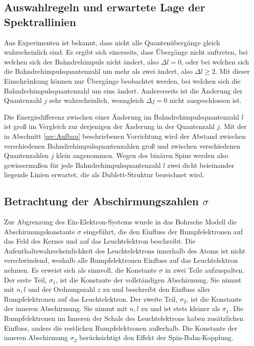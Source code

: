 \subsection{Auswahlregeln und erwartete Lage der Spektrallinien}
Aus Experimenten ist bekannt, dass nicht alle Quantenübergänge gleich wahrscheinlich sind.
Es ergibt sich einerseits, dass Übergänge nicht auftreten, bei welchen sich der Bahndrehimpuls nicht ändert, also $\Delta l=0$, oder bei welchen sich die Bahndrehimpulsquantenzahl um mehr als zwei ändert, also $\Delta l\ge2$.
Mit dieser Einschränkung können nur Übergänge beobachtet werden, bei welchen sich die Bahndrehimpulsquantenzahl um eins ändert.
Andererseits ist die Änderung der Quantenzahl $j$ sehr wahrscheinlich, wenngleich $\Delta j=0$ nicht ausgeschlossen ist.

Die Energiedifferenz zwischen einer Änderung im Bahndrehimpulsquantenzahl $l$ ist groß im Vergleich zur derjenigen der Änderung in der Quantenzahl $j$.
Mit der in Abschnitt \ref{sec:Aufbau} beschriebenen Vorrichtung wird der Abstand zwischen verschiedenen Bahndrehimpulsquantenzahlen groß und zwischen verschiedenen Quantenzahlen $j$ klein angenommen.
Wegen des binären Spins werden also gewissermaßen für jede Bahndrehimpulsquantenzahl $l$ zwei dicht beieinander liegende Linien erwartet, die als Dublett-Struktur bezeichnet wird.

\subsection{Betrachtung der Abschirmungszahlen \texorpdfstring{$\sigma$}{Sigma}}
Zur Abgrenzung des Ein-Elektron-Systems wurde in das Bohrsche Modell die Abschirmungskonstante $\sigma$ eingeführt, die den Einfluss der Rumpfelektronen auf das Feld des Kernes und auf das Leuchtelektron beschreibt.
Die Aufenthaltswahrscheinlichkeit des Leuchtelektrons innerhalb des Atoms ist nicht verschwindend, weshalb alle Rumpfelektronen Einfluss auf das Leuchtelektron nehmen.
Es erweist sich als sinnvoll, die Konstante $\sigma$ in zwei Teile aufzuspalten.\\
Der erste Teil, $\sigma_1$, ist die Konstante der vollständigen Abschirmung. 
Sie nimmt mit $n,l$ und der Ordnungszahl $z$ zu und beschreibt den Einfluss aller Rumpfelektronen auf das Leuchtelektron.
Der zweite Teil, $\sigma_2$, ist die Konstante der inneren Abschirmung. 
Sie nimmt mit $n,l$ zu und ist stets kleiner als $\sigma_1$.
Die Rumpfelektronen im Inneren der Schale des Leuchtelektrons haben zusätzlichen Einfluss, anders die restlichen Rumpfelektronen außerhalb.
Die Konstante der inneren Abschirmung $\sigma_2$ berücksichtigt den Effekt der Spin-Bahn-Kopplung.

